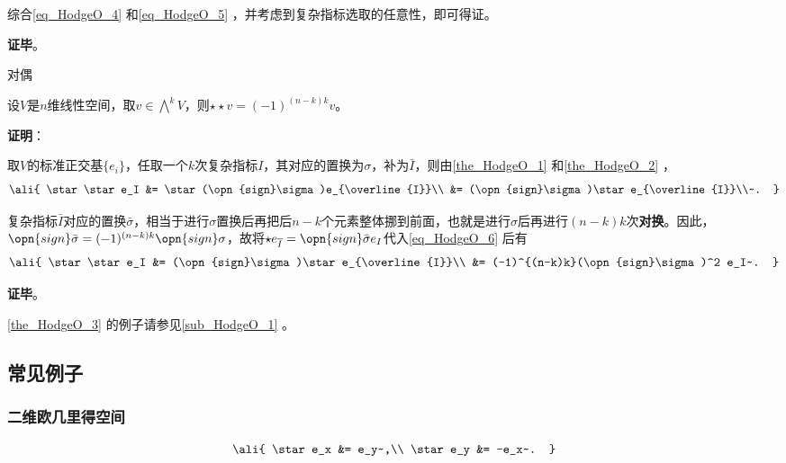 综合\autoref{eq_HodgeO_4} 和\autoref{eq_HodgeO_5} ，并考虑到复杂指标选取的任意性，即可得证。


\textbf{证毕}。



\begin{theorem}{对偶}\label{the_HodgeO_3}

设$V$是$n$维线性空间，取$v\in\bigwedge^k V$，则$\star \star v = (-1)^{(n-k)k} v$。

\end{theorem}

\textbf{证明}：

取$V$的标准正交基$\{e_i\}$，任取一个$k$次复杂指标$I$，其对应的置换为$\sigma$，补为$\bar{I}$，则由\autoref{the_HodgeO_1} 和\autoref{the_HodgeO_2} ，
\begin{equation}\label{eq_HodgeO_6}
\ali{
    \star \star e_I &= \star(\opn{sign}\sigma)e_{\overline{I}}\\
    &= (\opn{sign}\sigma)\star e_{\overline{I}}\\~.
}
\end{equation}

复杂指标$\bar{I}$对应的置换$\bar{\sigma}$，相当于进行$\sigma$置换后再把后$n-k$个元素整体挪到前面，也就是进行$\sigma$后再进行$(n-k)k$次\textbf{对换}。因此，$\opn{sign}\bar{\sigma}=(-1)^{(n-k)k}\opn{sign}\sigma$，故将$\star e_{\overline{I}}=\opn{sign}\bar{\sigma}e_I$代入\autoref{eq_HodgeO_6} 后有
\begin{equation}
\ali{
    \star \star e_I &= (\opn{sign}\sigma)\star e_{\overline{I}}\\
    &= (-1)^{(n-k)k}(\opn{sign}\sigma)^2 e_I~.
}
\end{equation}

\textbf{证毕}。

\autoref{the_HodgeO_3} 的例子请参见\autoref{sub_HodgeO_1} 。



\subsection{常见例子}\label{sub_HodgeO_1}


\subsubsection{二维欧几里得空间}


\begin{equation}
\ali{
    \star e_x &= e_y~,\\
    \star e_y &= -e_x~.
}
\end{equation}


